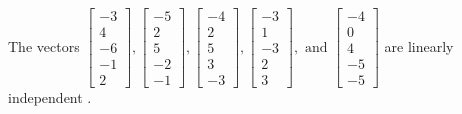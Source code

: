 \begin{exercise}
\begin{exerciseStatement}
  \end{exerciseStatement}
  \begin{exerciseAnswer}
   The vectors \(\left[\begin{array}{r}
-3 \\
4 \\
-6 \\
-1 \\
2
\end{array}\right] , \left[\begin{array}{r}
-5 \\
2 \\
5 \\
-2 \\
-1
\end{array}\right] , \left[\begin{array}{r}
-4 \\
2 \\
5 \\
3 \\
-3
\end{array}\right] , \left[\begin{array}{r}
-3 \\
1 \\
-3 \\
2 \\
3
\end{array}\right] , \text{ and } \left[\begin{array}{r}
-4 \\
0 \\
4 \\
-5 \\
-5
\end{array}\right]\) are 
  	 linearly independent  .
  


  \end{exerciseAnswer}
\end{exercise}